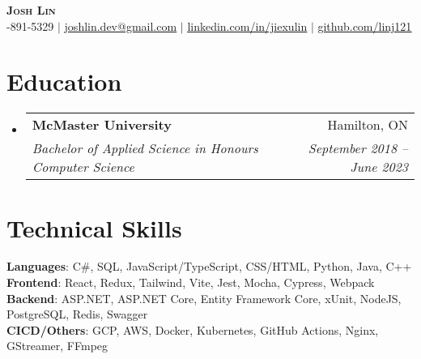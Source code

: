 \documentclass[letterpaper,11pt]{article}
\makeatletter
\newcommand{\resumeSubheading}[4]{
  \vspace{-2pt}\item
    \begin{tabular*}{0.97\textwidth}[t]{l@{\extracolsep{\fill}}r}
      \textbf{#1} & #2 \\
      \textit{\small#3} & \textit{\small #4} \\
    \end{tabular*}\vspace{-7pt}
}
\newcommand{\resumeSubHeadingListStart}{\begin{itemize}[leftmargin=0.15in, label={}]}
\newcommand{\resumeSubHeadingListEnd}{\end{itemize}}
\makeatother
\begin{document}

\begin{center}
    \textbf{\Huge \scshape Josh Lin} \\ \vspace{7pt}
    \small \faPhone \thinspace {}-891-5329
    $|$ \faEnvelope \thinspace \thinspace \href{mailto:joshlin.dev@gmail.com}{\underline{joshlin.dev@gmail.com}}
    $|$ \faLinkedin \thinspace \thinspace \href{https://linkedin.com/in/jiexulin}{\underline{linkedin.com/in/jiexulin}}
    $|$ \faGithub \thinspace \thinspace \href{https://github.com/linj121}{\underline{github.com/linj121}}
\end{center}


\section{Education}
  \resumeSubHeadingListStart
    \resumeSubheading
      {McMaster University}{Hamilton, ON}
      {Bachelor of Applied Science in Honours Computer Science}{September 2018 -- June 2023}
  \resumeSubHeadingListEnd

%

\section{Technical Skills}
 \begin{itemize}[leftmargin=0.15in, label={}]
    \small{\item{
      \textbf{Languages}{: C\#, SQL, JavaScript/TypeScript, CSS/HTML, Python,  Java, C++} \\
      \textbf{Frontend}{: React, Redux, Tailwind, Vite, Jest, Mocha, Cypress, Webpack } \\
      \textbf{Backend}{: ASP.NET, ASP.NET Core, Entity Framework Core, xUnit, NodeJS, PostgreSQL, Redis, Swagger } \\
      \textbf{CICD/Others}{: GCP, AWS, Docker, Kubernetes, GitHub Actions, Nginx, GStreamer, FFmpeg } \\
     }}
 \end{itemize}
\end{document}
